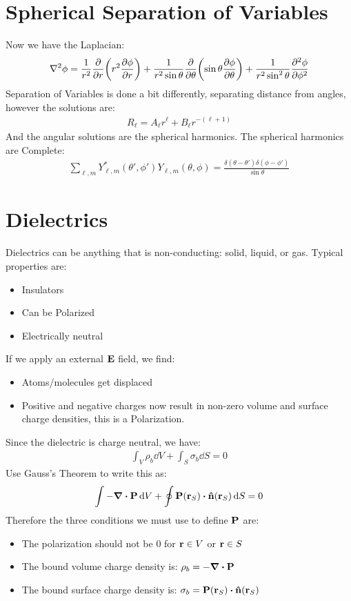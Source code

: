\documentclass[12pt]{article}
\theoremstyle{plain}
\theoremstyle{definition}
\let\temp\phi
\let\phi\varphi
\let\varphi\temp
\begin{document}
\section{Spherical Separation of Variables}
Now we have the Laplacian:
\begin{align*}
  \laplacian{\phi}=\frac1{r^2}\pdv{r}\qty(r^2\pdv{\phi}{r})
  +\frac1{r^2\sin\theta}\pdv{\theta}(\sin\theta\pdv{\phi}{\theta})
  +\frac1{r^2\sin^2\theta}\pdv[2]{\phi}{\varphi}
\end{align*}
Separation of Variables is done a bit differently, separating distance from angles, however the solutions are:
\begin{align*}
  R_\ell=A_\ell r^\ell+B_\ell r^{-(\ell+1)}
\end{align*}
And the angular solutions are the spherical harmonics. The spherical harmonics are Complete:
\begin{align*}
  \sum_{\ell,m}Y_{\ell,m}^*(\theta',\varphi')Y_{\ell,m}(\theta,\varphi)=
  \frac{\delta(\theta-\theta')\delta(\varphi-\varphi')}{\sin\theta}
\end{align*}

\section{Dielectrics}
Dielectrics can be anything that is non-conducting: solid, liquid, or gas. Typical properties are:
\begin{itemize}
\item Insulators
\item Can be Polarized
\item Electrically neutral
\end{itemize}
If we apply an external $\vb{E}$ field, we find:
\begin{itemize}
\item Atoms/molecules get displaced
\item Positive and negative charges now result in non-zero volume and surface charge densities, this is a Polarization. 
\end{itemize}
Since the dielectric is charge neutral, we have:
\begin{align*}
  \int_V\rho_b\dd{V}+\int_S\sigma_b\dd{S}=0
\end{align*}
Use Gauss's Theorem to write this as:
\begin{align*}
  \int-\div{\vb{P}}\dd{V}+\oint\vb{P}(\vb{r}_S)\vdot\vu{n}(\vb{r}_S)\dd{S}=0
\end{align*}
Therefore the three conditions we must use to define $\vb{P}$ are:
\begin{itemize}
\item The polarization should not be $0$ for $\vb{r}\in V$ or $\vb{r}\in S$
\item The bound volume charge density is: $\rho_b=-\div{\vb{P}}$
\item The bound surface charge density is: $\sigma_b=\vb{P}(\vb{r}_S)\vdot\vu{n}(\vb{r}_S)$
\end{itemize}
\end{document}
